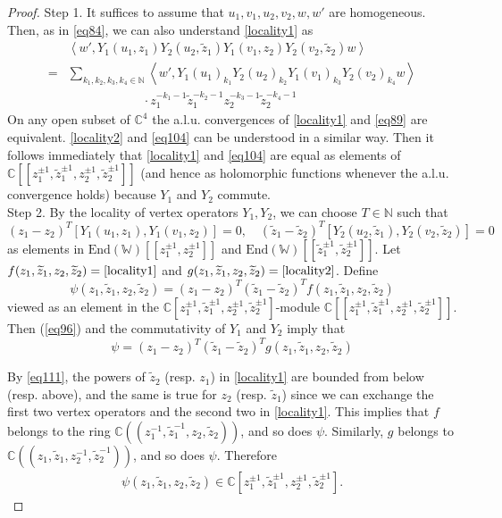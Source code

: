 \documentclass[11pt,b5paper,notitlepage]{article}
\theoremstyle{definition}
\theoremstyle{plain}
\newcommand{\wtd}{\widetilde}
\newcommand{\End}{\mathrm{End}} %
\newcommand{\Wbb}{\mathbb W}
\newcommand{\Cbb}{\mathbb C}
\newcommand{\Nbb}{\mathbb N}
\newcommand{\<}{\left\langle}
\renewcommand{\>}{\right\rangle}
\numberwithin{equation}{subsection}
\begin{document}
\begin{proof}

Step 1. It suffices to assume that $u_1,v_1,u_2,v_2,w,w'$ are homogeneous. Then, as in \eqref{eq84}, we can also understand \eqref{locality1} as
\begin{align}
&\<w',Y_1(u_1,z_1)Y_2(u_2,\wtd z_1)Y_1(v_1,z_2)Y_2(v_2,\wtd z_2)w\>\nonumber\\
=&\sum_{k_1,k_2,k_3,k_4\in\Nbb}\<w',Y_1(u_1)_{k_1}Y_2(u_2)_{k_2}Y_1(v_1)_{k_3}Y_2(v_2)_{k_4}w\>\nonumber\\
&\qquad\qquad\qquad\cdot z_1^{-k_1-1}\wtd z_1^{-k_2-1}z_2^{-k_3-1}\wtd z_2^{-k_4-1}  \label{eq89}
\end{align}
On any open subset of $\Cbb^4$ the a.l.u. convergences of \eqref{locality1} and \eqref{eq89} are equivalent.  \eqref{locality2} and \eqref{eq104} can be understood in a similar way. Then it follows immediately that \eqref{locality1} and \eqref{eq104} are equal as elements of $\Cbb[[z_1^{\pm 1},\wtd z_1^{\pm 1},z_2^{\pm 1},\wtd z_2^{\pm 1}]]$ (and hence as holomorphic functions whenever the a.l.u. convergence holds) because $Y_1$ and $Y_2$ commute.\\[-1ex]


Step 2. By the locality of vertex operators $Y_1,Y_2$, we can choose $T\in \Nbb$ such that 
    \begin{equation}\label{eq96}
    (z_1-z_2)^T [Y_1(u_1,z_1),Y_1(v_1,z_2)]=0,\quad (\wtd z_1-\wtd z_2)^T [Y_2(u_2,\wtd z_1),Y_2(v_2,\wtd z_2)]=0
    \end{equation}
    as elements in $\End(\Wbb)[[z_1^{\pm 1},z_2^{\pm 1}]]$ and $\End(\Wbb)[[\wtd z_1^{\pm 1},\wtd z_2^{\pm 1}]]$. Let $f(z_1,\wtd z_1,z_2,\wtd z_2)=\eqref{locality1}$ and $g(z_1,\wtd z_1,z_2,\wtd z_2)=\eqref{locality2}$. Define 
    \begin{equation}\label{locality4}
    \psi(z_1,\wtd z_1,z_2,\wtd z_2)=(z_1-z_2)^T (\wtd z_1-\wtd z_2)^T  f(z_1,\wtd z_1,z_2,\wtd z_2)
    \end{equation}
viewed as an element in the $\Cbb[z_1^{\pm 1},\wtd z_1^{\pm 1},z_2^{\pm 1},\wtd z_2^{\pm 1}]$-module $\Cbb[[z_1^{\pm 1},\wtd z_1^{\pm 1},z_2^{\pm 1},\wtd z_2^{\pm 1}]]$. Then  (\ref{eq96}) and the commutativity of $Y_1$ and $Y_2$ imply that
    $$
    \psi=(z_1-z_2)^T (\wtd z_1-\wtd z_2)^T  g(z_1,\wtd z_1,z_2,\wtd z_2)
    $$

By \eqref{eq111}, the powers of $\wtd z_2$ (resp. $z_1$) in \eqref{locality1} are bounded from below (resp. above), and the same is true for $z_2$ (resp. $\wtd z_1$) since we can exchange the first two vertex operators and the second two in \eqref{locality1}. This implies that $f$ belongs to the ring $\Cbb((z_1^{-1},\wtd z_1^{-1},z_2,\wtd z_2))$, and so does $\psi$. Similarly, $g$ belongs to $\Cbb((z_1,\wtd z_1,z_2^{-1},\wtd z_2^{-1}))$, and so does $\psi$. Therefore
\begin{gather*}
\psi(z_1,\wtd z_1,z_2,\wtd z_2) \in \Cbb[z_1^{\pm 1},\wtd z_1^{\pm 1},z_2^{\pm 1},\wtd z_2^{\pm 1}].
\end{gather*}



\end{proof}
\end{document}
